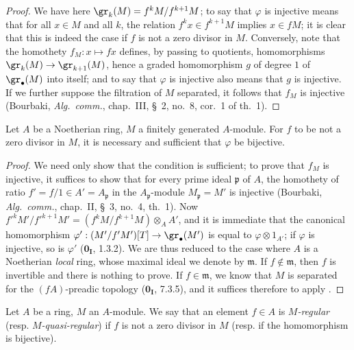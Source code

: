 \begin{proof}
We have here $\gr_k(M)=f^kM/f^{k+1}M$;
to say that $\varphi$ is injective means that for all $x\in M$ and all $k$, the relation $f^kx\in f^{k+1}M$ implies $x\in fM$;
it is clear that this is indeed the case if $f$ is not a zero divisor in $M$.
Conversely, note that the homothety $f_M:x\mapsto fx$ defines, by passing to quotients, homomorphisms $\gr_k(M)\to\gr_{k+1}(M)$, hence a graded homomorphism $g$ of degree $1$ of $\gr_\bullet(M)$ into itself;
and to say that $\varphi$ is injective also means that $g$ is injective.
If we further suppose the filtration of $M$ separated, it follows that $f_M$ is injective
(Bourbaki, \emph{Alg.~comm.}, chap.~III, \S~2, no.~8, cor.~1 of th.~1).
\end{proof}

\begin{corollary}[15.1.3]
\label{0.15.1.3}
Let $A$ be a Noetherian ring, $M$ a finitely generated $A$-module.
For $f$ to be not a zero divisor in $M$, it is necessary and sufficient that $\varphi$ be bijective.
\end{corollary}

\begin{proof}
We need only show that the condition is sufficient;
to prove that $f_M$ is injective, it suffices to show that for every prime ideal $\mathfrak{p}$ of $A$, the homothety of ratio $f'=f/1\in A'=A_\mathfrak{p}$ in the $A_\mathfrak{p}$-module $M_\mathfrak{p}=M'$ is injective
(Bourbaki, \emph{Alg.~comm.}, chap.~II, \S~3, no.~4, th.~1).
Now $f'^kM'/f'^{k+1}M'=(f^kM/f^{k+1}M)\otimes_A A'$, and it is immediate that the canonical homomorphism $\varphi':(M'/f'M')[T]\to\gr_\bullet(M')$ is equal to $\varphi\otimes 1_{A'}$;
if $\varphi$ is injective, so is $\varphi'$ ($\mathbf{0_I}$, 1.3.2).
We are thus reduced to the case where $A$ is a Noetherian \emph{local} ring, whose maximal ideal we denote by $\mathfrak{m}$.
If $f\notin\mathfrak{m}$, then $f$ is invertible and there is nothing to prove.
If $f\in\mathfrak{m}$, we know that $M$ is separated for the $(fA)$-preadic topology ($\mathbf{0_I}$, 7.3.5), and it suffices therefore to apply .
\end{proof}

\begin{definition}[15.1.4]
\label{0.15.1.4}
Let $A$ be a ring, $M$ an $A$-module.
We say that an element $f\in A$ is \emph{$M$-regular} (resp. \emph{$M$-quasi-regular}) if $f$ is not a zero divisor in $M$ (resp. if the homomorphism  is bijective).
\end{definition}

